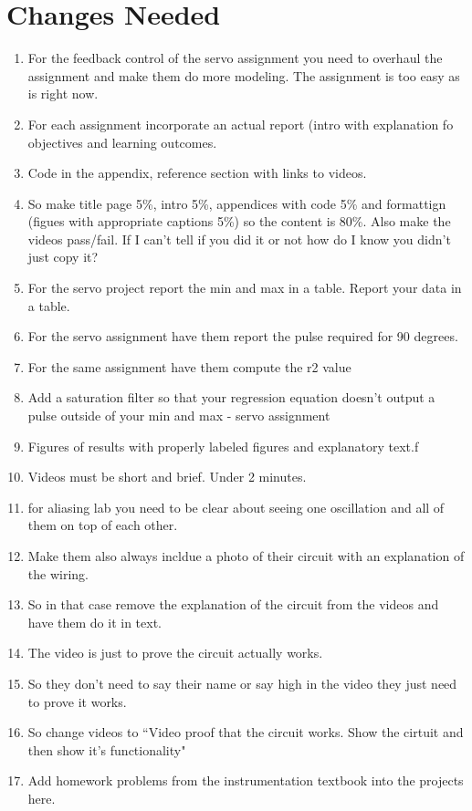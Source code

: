 \section{Changes Needed}
\begin{enumerate}[itemsep=-5pt]
\item For the feedback control of the servo assignment you need to overhaul the assignment and make them do more modeling. The assignment is too easy as is right now. 
\item For each assignment incorporate an actual report (intro with explanation fo objectives and learning outcomes.
\item Code in the appendix, reference section with links to videos.
\item So make title page 5\%, intro 5\%, appendices with code 5\% and formattign (figues with appropriate captions 5\%) so the content is 80\%. Also make the videos pass/fail. If I can't tell if you did it or not how do I know you didn't just copy it?
\item For the servo project report the min and max in a table. Report your data in a table.
\item For the servo assignment have them report the pulse required for 90 degrees.
\item For the same assignment have them compute the r2 value
\item Add a saturation filter so that your regression equation doesn't output a pulse outside of your min and max - servo assignment
\item Figures of results with properly labeled figures and explanatory text.f
\item Videos must be short and brief. Under 2 minutes. 
\item for aliasing lab you need to be clear about seeing one oscillation and all of them on top of each other. 
\item Make them also always incldue a photo of their circuit with an explanation of the wiring.
\item So in that case remove the explanation of the circuit from the videos and have them do it in text.
\item The video is just to prove the circuit actually works.
\item So they don't need to say their name or say high in the video they just need to prove it works.
\item So change videos to ``Video proof that the circuit works. Show the cirtuit and then show it's functionality"
\item Add homework problems from the instrumentation textbook into the projects here. 

\end{enumerate}
